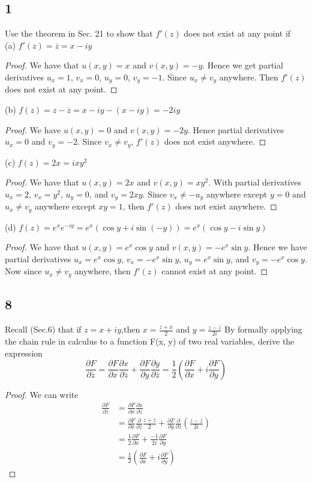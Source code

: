 \documentclass{article}
\newcommand{\zbar}{\overline{z}}
\newcommand{\partiald}[2]{\frac{\partial #1}{\partial #2}}
\begin{document}
    \subsection*{1}
    Use the theorem in Sec. 21 to show that $f'(z)$ does not exist at any point if\\
    (a) $f'(z) = \overline{z} = x - iy$
    \begin{proof}
        We have that $u(x,y) = x$ and $v(x,y) = -y$. Hence we get partial derivatives
        $u_x = 1$, $v_x = 0$, $u_y = 0$, $v_y = -1$. Since $u_x \neq v_y$ anywhere. Then $f'(z)$ does not
        exist at any point.
    \end{proof}
    (b) $f(z) = z - \overline{z} = x - iy - (x - iy) = -2iy$
    \begin{proof}
        We have $u(x,y) = 0$ and $v(x,y) = -2y$. Hence partial derivatives $u_x = 0$ and $v_y = -2$.
        Since $v_x \neq v_y$, $f'(z)$ does not exist anywhere.
    \end{proof}
    (c) $f(z) = 2x = ixy^2$
    \begin{proof}
        We have that $u(x,y) = 2x$ and $v(x,y) = xy^2$. With partial derivatives $u_x = 2$, $v_x = y^2$,
        $u_y = 0$, and $v_y = 2xy$. Since $v_x \neq -u_y$ anywhere except $y = 0$ and $u_x \neq v_y$
        anywhere except $xy = 1$, then $f'(z)$ does not exist anywhere.
    \end{proof}
    (d) $f(z) = e^x e^{-iy} = e^x(\cos y + i\sin(-y)) = e^x(\cos y - i\sin y)$
    \begin{proof}
       We have that $u(x,y) = e^x\cos y$ and $v(x,y) = -e^x\sin y$. Hence we have partial derivatives
       $u_x = e^x\cos y$, $v_x = -e^x\sin y$, $u_y = e^x\sin y$, and $v_y = -e^x\cos y$.
       Now since $u_x \neq v_y$ anywhere, then $f'(z)$ cannot exist at any point. 
    \end{proof}
    \subsection*{8}
    Recall (Sec.6) that if $z=x+iy$,then $x = \frac{z + \overline{x}}{2}$ and 
    $y = \frac{z - \overline{z}}{2i}$ By formally applying the chain rule in calculus to a function F(x, y) of 
    two real variables, derive the expression
    $$\partiald{F}{\zbar} = \partiald{F}{x}\partiald{x}{\zbar} +
    \partiald{F}{y}\partiald{y}{\zbar} =
    \frac{1}{2}\left(\partiald{F}{x}+ i\partiald{F}{y}\right)$$
    \begin{proof}
        We can write
        \begin{align*}
            \partiald{F}{\zbar} &= \partiald{F}{x}\partiald{x}{\zbar} \\
                &= \partiald{F}{x}\partiald{}{\zbar}\frac{z + \zbar}{2} +
                    \partiald{F}{y}\partiald{}{\zbar}(\frac{z - \zbar}{2i}) \\
                &= \frac{1}{2}\partiald{F}{x} + \frac{-1}{2i}\partiald{F}{y} \\
                &= \frac{1}{2}\left(\partiald{F}{x}+ i\partiald{F}{y}\right)
        \end{align*}
    \end{proof}
\end{document}
